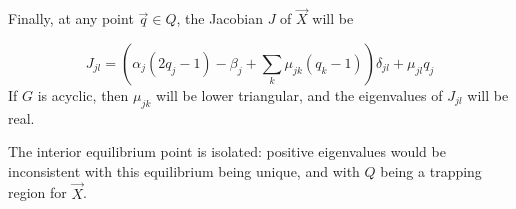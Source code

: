 \documentclass{article}
\begin{document}

Finally, at any point $\vec{q} \in Q$, the Jacobian $J$ of $\vec{X}$ will be

\begin{equation}
    J_{jl} = \left(\alpha_j (2 q_j - 1) - \beta_j + \sum_k \mu_{jk} (q_k - 1)
    \right) \delta_{jl} + \mu_{jl} q_j
\end{equation}
If $G$ is acyclic, then $\mu_{jk}$ will be lower triangular, and the eigenvalues
of $J_{jl}$ will be real.

The interior equilibrium point is isolated: positive eigenvalues would be
inconsistent with this equilibrium being unique, and with $Q$ being a trapping
region for $\vec{X}$. 
\end{document}

